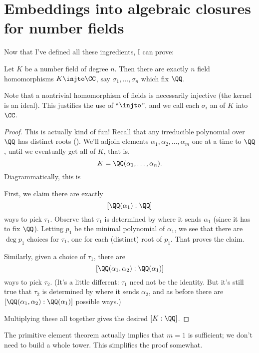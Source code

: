 \section{Embeddings into algebraic closures for number fields}
Now that I've defined all these ingredients, I can prove:
\begin{theorem}
	\label{thm:n_embeddings}
	Let $K$ be a number field of degree $n$.
	Then there are exactly $n$ field homomorphisms $K \injto \CC$,
	say $\sigma_1, \dots, \sigma_n$ which fix $\QQ$.
\end{theorem}
\begin{remark}
	Note that a nontrivial homomorphism of fields is necessarily injective
	(the kernel is an ideal).
	This justifies the use of ``$\injto$'', and we call each $\sigma_i$ an
	 of $K$ into $\CC$.
\end{remark}
\begin{proof}
	This is actually kind of fun!
	Recall that any irreducible polynomial over $\QQ$ has distinct roots ().
	We'll adjoin elements $\alpha_1, \alpha_2, \dots, \alpha_m$ one at a time to $\QQ$,
	until we eventually get all of $K$, that is,
	\[ K = \QQ(\alpha_1, \dots, \alpha_n). \]
	Diagrammatically, this is
	\begin{center}
	\end{center}
	First, we claim there are exactly \[ [\QQ(\alpha_1) : \QQ] \] ways to pick $\tau_1$.
	Observe that $\tau_1$ is determined by where it sends $\alpha_1$ (since it has to fix $\QQ$).
	Letting $p_1$ be the minimal polynomial of $\alpha_1$, we see that there are $\deg p_1$ choices for $\tau_1$,
	one for each (distinct) root of $p_1$. That proves the claim.

	Similarly, given a choice of $\tau_1$, there are
	\[ [\QQ(\alpha_1, \alpha_2) : \QQ(\alpha_1)] \]
	ways to pick $\tau_2$.
	(It's a little different: $\tau_1$ need not be the identity.
	But it's still true that $\tau_2$ is determined by where it sends $\alpha_2$,
	and as before there are $[\QQ(\alpha_1, \alpha_2) : \QQ(\alpha_1)]$ possible ways.)

	Multiplying these all together gives the desired $[K:\QQ]$.
\end{proof}
\begin{remark}
	The primitive element theorem actually implies that $m = 1$
	is sufficient; we don't need to build a whole tower.
	This simplifies the proof somewhat.
\end{remark}

